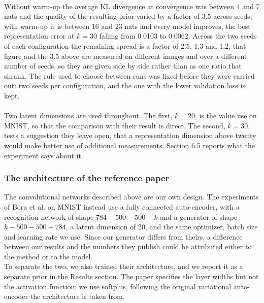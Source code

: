 \\
Without warm-up the average KL divergence at convergence was between 4 and 7 nats and the quality of the resulting prior varied by a factor of 3.5 across seeds; with warm-up it is between 16 and 23 nats and every model improves, the best representation error at \( k = 30 \) falling from 0.0103 to 0.0062. Across the two seeds of each configuration the remaining spread is a factor of 2.5, 1.3 and 1.2; that figure and the 3.5 above are measured on different images and over a different number of seeds, so they are given side by side rather than as one ratio that shrank. The rule used to choose between runs was fixed before they were carried out: two seeds per configuration, and the one with the lower validation loss is kept.
\\\\
Two latent dimensions are used throughout. The first, \( k = 20 \), is the value \cite{bora2017} use on MNIST, so that the comparison with their result is direct. The second, \( k = 30 \), tests a suggestion they leave open, that a representation dimension above twenty would make better use of additional measurements. Section 6.5 reports what the experiment says about it.
\subsubsection{The architecture of the reference paper}

The convolutional networks described above are our own design. The experiments of Bora et al. \cite{bora2017} on MNIST instead use a fully connected auto-encoder, with a recognition network of shape \( 784-500-500-k \) and a generator of shape \( k-500-500-784 \), a latent dimension of 20, and the same optimizer, batch size and learning rate we use. Since our generator differs from theirs, a difference between our results and the numbers they publish could be attributed either to the method or to the model.
\\
To separate the two, we also trained their architecture, and we report it as a separate prior in the Results section. The paper specifies the layer widths but not the activation function; we use softplus, following the original variational auto-encoder \cite{kingma2014} the architecture is taken from.

